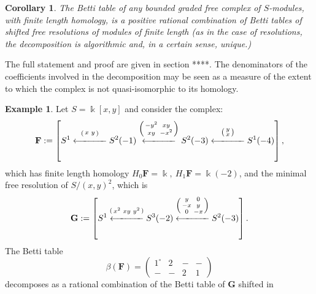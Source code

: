 \documentclass[12pt]{amsart}
\newtheorem{cor}[lemma]{Corollary}
\theoremstyle{definition}
\newtheorem{example}[lemma]{Example}
\theoremstyle{remark}
\newcommand{\kk}{\Bbbk}
\newcommand{\bG}{\mathbf{G}}
\newcommand{\FF}{\mathbf{F}}
\begin{document}
\begin{cor}\label{cor:decompose}
The Betti table of any bounded graded free complex of $S$-modules, with finite length homology, is a positive rational combination of Betti tables of shifted free resolutions of modules of finite length (as in the case of resolutions, the decomposition is algorithmic and, in a certain sense, unique.)
\end{cor}

The full statement and proof are given in section ****. The denominators of the coefficients involved in the decomposition may be seen as a measure of the extent to which the complex is not quasi-isomorphic to its homology. 

\begin{example}
Let $S=\kk[x,y]$ and consider the complex:
\[
\FF := \left[S^1\overset{\left(\begin{smallmatrix}x&y\end{smallmatrix}\right)}{\xlongleftarrow{\hspace*{1.1cm}}} S^2(-1)\overset{\left(\begin{smallmatrix}-y^2&xy\\xy&-x^2\end{smallmatrix}\right)}{\xlongleftarrow{\hspace*{1.1cm}}} S^2(-3)\overset{\left(\begin{smallmatrix}y\\x\end{smallmatrix}\right)}{\xlongleftarrow{\hspace*{1.1cm}}} S^1(-4)\right],
\]
which has finite length homology $H_{0}\FF = \kk,\ H_{1}\FF = \kk(-2)$, and the minimal free resolution of $S/(x,y)^{2}$, which 
is
\[
\bG := 
\left[S^1\overset{\left(\begin{smallmatrix}x^{2}&xy&y^{2}\end{smallmatrix}\right)}
{\xlongleftarrow{\hspace*{1.1cm}}} 
S^3(-2)\overset{\left(\begin{smallmatrix}y&0\\-x&y\\0&-x\end{smallmatrix}\right)}{\xlongleftarrow{\hspace*{1.1cm}}} S^2(-3)\right].
\]
The Betti table
$$
\beta(\FF)=\begin{pmatrix} 1^\circ&2&-&-\\-&-&2&1\end{pmatrix}
$$
decomposes as a rational combination of the Betti table of $\bG$ shifted in 

\end{example}
\end{document}

